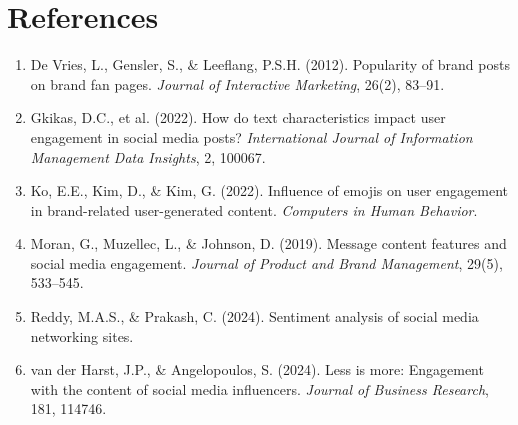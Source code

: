 \documentclass[12pt,a4paper]{article}
\begin{document}
\section*{References}

\begin{enumerate}[leftmargin=1.5em]
    \item De Vries, L., Gensler, S., \& Leeflang, P.S.H. (2012). Popularity of brand posts on brand fan pages. \textit{Journal of Interactive Marketing}, 26(2), 83--91.
    \item Gkikas, D.C., et al. (2022). How do text characteristics impact user engagement in social media posts? \textit{International Journal of Information Management Data Insights}, 2, 100067.
    \item Ko, E.E., Kim, D., \& Kim, G. (2022). Influence of emojis on user engagement in brand-related user-generated content. \textit{Computers in Human Behavior}.
    \item Moran, G., Muzellec, L., \& Johnson, D. (2019). Message content features and social media engagement. \textit{Journal of Product and Brand Management}, 29(5), 533--545.
    \item Reddy, M.A.S., \& Prakash, C. (2024). Sentiment analysis of social media networking sites.
    \item van der Harst, J.P., \& Angelopoulos, S. (2024). Less is more: Engagement with the content of social media influencers. \textit{Journal of Business Research}, 181, 114746.
\end{enumerate}
\end{document}
